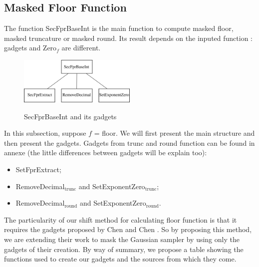 \documentclass[runningheads]{llncs}
\begin{document}
    \subsection{Masked Floor Function}
    The function SecFprBaseInt is the main function to compute masked floor, masked truncature or masked round. Its result depends on the inputed function : gadgets and Zero$_f$ are different. 
    \begin{figure}[h!]
        \centering
        \includegraphics[width=0.5\textwidth]{figure/secpfrhierarchie.pdf}
        \label{fig:hierar}
        \caption{SecFprBaseInt and its gadgets}
    \end{figure}

    In this subsection, suppose $f$ = floor. We will first present the main structure and then present the gadgets. Gadgets from trunc and round function can be found in annexe (the little differences between gadgets will be explain too):
    \begin{itemize}%
        \item SetFprExtract;
        \item RemoveDecimal$_\text{trunc}$ and SetExponentZero$_\text{trunc}$;
        \item RemoveDecimal$_\text{round}$ and SetExponentZero$_\text{round}$.
    \end{itemize}
    The particularity of our shift method for calculating floor function is that it requires the gadgets proposed by Chen and Chen \cite{Chen_Chen_2024}. So by proposing this method, we are extending their work to mask the Gaussian sampler by using only the gadgets of their creation.
    By way of summary, we propose a table showing the functions used to create our gadgets and the sources from which they come.
\end{document}
